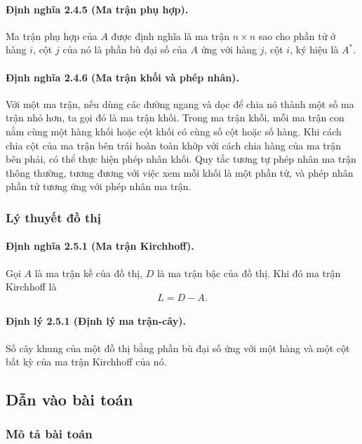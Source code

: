 \documentclass[11pt]{article}
\begin{document}
\paragraph{Định nghĩa 2.4.5 (Ma trận phụ hợp).}
Ma trận phụ hợp của \(A\) được định nghĩa là ma trận \(n\times n\) sao cho phần
tử ở hàng \(i\), cột \(j\) của nó là phần bù đại số của \(A\) ứng với hàng
\(j\), cột \(i\), ký hiệu là \(A^\ast\).

\paragraph{Định nghĩa 2.4.6 (Ma trận khối và phép nhân).}
Với một ma trận, nếu dùng các đường ngang và dọc để chia nó thành một số ma trận
nhỏ hơn, ta gọi đó là ma trận khối. Trong ma trận khối, mỗi ma trận con nằm cùng
một hàng khối hoặc cột khối có cùng số cột hoặc số hàng. Khi cách chia cột của
ma trận bên trái hoàn toàn khớp với cách chia hàng của ma trận bên phải, có thể
thực hiện phép nhân khối. Quy tắc tương tự phép nhân ma trận thông thường, tương
đương với việc xem mỗi khối là một phần tử, và phép nhân phần tử tương ứng với
phép nhân ma trận.

\subsubsection{Lý thuyết đồ thị}

\paragraph{Định nghĩa 2.5.1 (Ma trận Kirchhoff).}
Gọi \(A\) là ma trận kề của đồ thị, \(D\) là ma trận bậc của đồ thị. Khi đó ma
trận Kirchhoff là
\[
  L=D-A.
\]

\paragraph{Định lý 2.5.1 (Định lý ma trận-cây).}
Số cây khung của một đồ thị bằng phần bù đại số ứng với một hàng và một cột bất
kỳ của ma trận Kirchhoff của nó.

\subsection{Dẫn vào bài toán}

\subsubsection{Mô tả bài toán}
\end{document}
